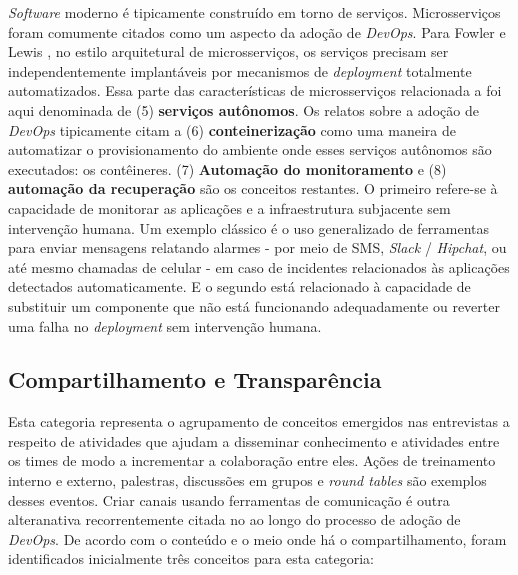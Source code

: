 {\it Software} moderno é tipicamente construído em torno de serviços.
Microsserviços foram comumente citados como um aspecto da adoção de {\it DevOps}.
Para Fowler e Lewis \cite{martinfowler2014microservices}, no estilo arquitetural
de microsserviços, os serviços precisam ser independentemente implantáveis por
mecanismos de {\it deployment} totalmente automatizados. Essa parte das
características de microsserviços relacionada a  foi aqui
denominada de (5) {\bf serviços autônomos}. Os relatos sobre a adoção de {\it DevOps}
tipicamente citam a (6) {\bf conteinerização} como uma maneira de automatizar o
provisionamento do ambiente onde esses serviços autônomos são executados: os
contêineres. (7) {\bf Automação do monitoramento} e (8) {\bf automação da
recuperação} são os conceitos restantes. O primeiro refere-se à capacidade de
monitorar as aplicações e a infraestrutura subjacente sem intervenção humana.
Um exemplo clássico é o uso generalizado de ferramentas para enviar mensagens
relatando alarmes - por meio de SMS, {\it Slack} / {\it Hipchat}, ou até mesmo
chamadas de celular - em caso de incidentes relacionados às aplicações
detectados automaticamente. E o segundo está relacionado à capacidade de
substituir um componente que não está funcionando adequadamente ou reverter uma
falha no {\it deployment} sem intervenção humana.

\subsection{Compartilhamento e Transparência}

Esta categoria representa o agrupamento de conceitos emergidos
nas entrevistas a respeito de atividades que ajudam a
disseminar conhecimento e atividades entre os times de modo a incrementar a
colaboração entre eles. Ações de treinamento interno e externo, palestras,
discussões em grupos e {\it round tables} são exemplos desses eventos. Criar
canais usando ferramentas de comunicação é outra alteranativa recorrentemente
citada no  ao longo do processo de adoção de
{\it DevOps}. De acordo com o conteúdo e o meio onde há o compartilhamento,
foram identificados inicialmente três conceitos para esta categoria:


